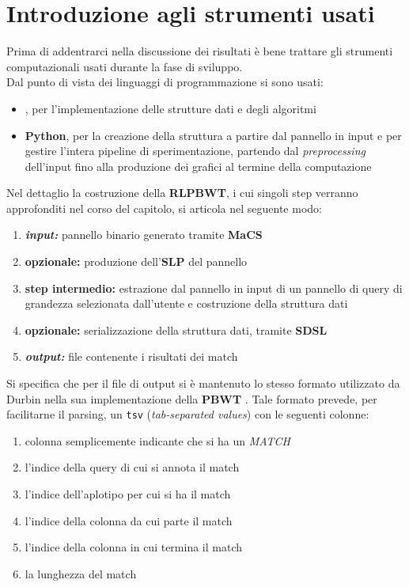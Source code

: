 \section{Introduzione agli strumenti usati}
Prima di addentrarci nella discussione dei risultati è bene trattare gli
strumenti computazionali usati durante la fase di sviluppo.\\
Dal punto di vista dei linguaggi di programmazione si sono usati:
\begin{itemize}
  \item \textbf{\Cplusplus}, per l'implementazione delle strutture dati e degli
  algoritmi
  \item \textbf{Python}, per la creazione della struttura a partire dal
  pannello in input e per gestire l'intera pipeline di sperimentazione,
  partendo dal \textit{preprocessing} dell'input fino alla produzione dei
  grafici al termine della computazione
\end{itemize}
Nel dettaglio la costruzione della \textbf{RLPBWT}, i cui
singoli step verranno approfonditi nel corso del capitolo, si articola nel
seguente modo: 
\begin{enumerate}
  \item \textit{\textbf{input:}} pannello binario generato tramite
  \textbf{MaCS}
  \item \textbf{opzionale:} produzione dell'\textbf{SLP} del pannello
  \item \textbf{step intermedio:} estrazione dal pannello in input di un
  pannello di query di grandezza selezionata dall'utente e costruzione della
  struttura dati  
  \item \textbf{opzionale:} serializzazione della struttura dati, tramite
  \textbf{SDSL} 
  \item \textit{\textbf{output:}} file contenente i risultati dei match
\end{enumerate}
Si specifica che per il file di output si è mantenuto lo stesso formato
utilizzato da Durbin nella sua implementazione della \textbf{PBWT}
\cite{durbin_gh}. Tale formato prevede, per facilitarne il parsing, un
\texttt{tsv} (\textit{tab-separated values}) con le seguenti colonne:
\begin{enumerate}
  \item colonna semplicemente indicante che si ha un \textit{MATCH}
  \item l'indice della query di cui si annota il match
  \item l'indice dell'aplotipo per cui si ha il match
  \item l'indice della colonna da cui parte il match
  \item l'indice della colonna in cui termina il match
  \item la lunghezza del match
\end{enumerate}
